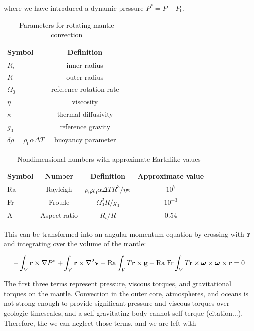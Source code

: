 \documentclass[extra,mreferee]{gji}
\begin{document}
where we have introduced a dynamic pressure $P^* = P - P_0$.

\begin{table}
\centering
\caption{Parameters for rotating mantle convection}
\label{parameters}
\begin{tabular}{@{}lcc}
Symbol & Definition\\
\hline
$R_i$ & inner radius \\
$R$ & outer radius \\
$\Omega_0$ & reference rotation rate \\
$\eta$ & viscosity \\
$\kappa$ & thermal diffusivity \\
$g_0$ & reference gravity \\
$\delta \rho = \rho_0 \alpha \Delta T$ & buoyancy parameter \\ 
\end{tabular}
\end{table}

\begin{table}
\centering
\caption{Nondimensional numbers with approximate Earthlike values}
\label{nondim}
\begin{tabular}{@{}lcccc}
Symbol &  Number & Definition & Approximate value \\
\hline
Ra & Rayleigh &  $\rho_0 g_0 \alpha \Delta T R^3/\eta \kappa$ & $10^7$\\
Fr & Froude & $\Omega_0^2 R/g_0$ & $10^{-3}$ \\
A & Aspect ratio & $R_i/R$ & $0.54$ \\
\end{tabular}
\end{table}
 
This can be transformed into an angular momentum equation by crossing with $\bf r$ and integrating over the volume of the mantle:

\begin{equation}
-\int_V {\bf r} \times \nabla P^* + \int_V {\bf r} \times \nabla^2 {\bf v} - \mathrm{Ra} \int_V T {\bf r \times g} + \mathrm{Ra \; Fr} \int_V T {\bf r \times \mitbf{\omega} \times \mitbf{\omega} \times r} = 0
\end{equation}

The first three terms represent pressure, viscous torques, and gravitational torques on the mantle.  
Convection in the outer core, atmospheres, and oceans is not strong enough to provide significant pressure and viscous torques over geologic timescales, and a self-gravitating body cannot self-torque (citation...).
Therefore, the we can neglect those terms, and we are left with
\end{document}
